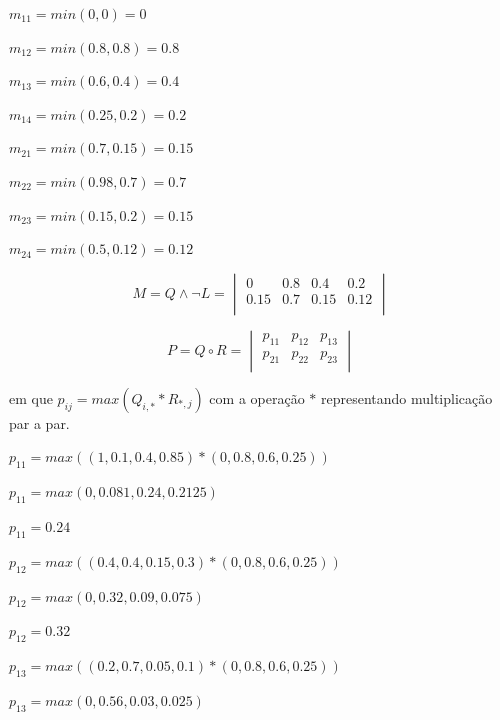 \documentclass[conference]{IEEEtran}
\begin{document}
\hspace{1cm}

$m_{11} = min(0, 0) = 0$

$m_{12} = min(0.8, 0.8) = 0.8$

$m_{13} = min(0.6, 0.4) = 0.4$

$m_{14} = min(0.25, 0.2) = 0.2$

\hspace{1cm}

$m_{21} = min(0.7, 0.15) = 0.15$

$m_{22} = min(0.98, 0.7) = 0.7$

$m_{23} = min(0.15, 0.2) = 0.15$

$m_{24} = min(0.5, 0.12) = 0.12$


\[
M = Q \wedge \neg L = 
\begin{vmatrix}
0 & 0.8 & 0.4 & 0.2 \\
0.15 & 0.7 & 0.15 & 0.12 \\
\end{vmatrix}
\]


\hspace{1cm} 


\[
P = Q \circ R = 
\begin{vmatrix}
p_{11} & p_{12} & p_{13} \\
p_{21} & p_{22} & p_{23} \\
\end{vmatrix}
\]

\hspace{1cm}

em que $p_{ij} = max(Q_{i,*} * R_{*, j})$ com a
operação $*$ representando multiplicação par a par.

\hspace{1cm}

$p_{11} = max((1, 0.1, 0.4, 0.85) * (0, 0.8, 0.6, 0.25))$

$p_{11} = max(0, 0.081, 0.24, 0.2125)$

$p_{11} = 0.24$

\hspace{.5cm}

$p_{12} = max((0.4, 0.4, 0.15, 0.3) * (0, 0.8, 0.6, 0.25))$

$p_{12} = max(0, 0.32, 0.09, 0.075)$

$p_{12} = 0.32$

\hspace{.5cm}

$p_{13} = max((0.2, 0.7, 0.05, 0.1) * (0, 0.8, 0.6, 0.25))$

$p_{13} = max(0, 0.56, 0.03, 0.025)$
\end{document}
